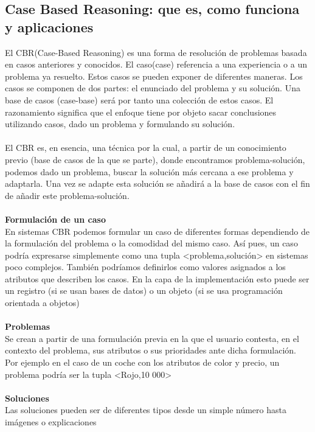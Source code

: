 \subsection{Case Based Reasoning: que es, como funciona y aplicaciones}
El CBR(Case-Based Reasoning)\cite{CBRLibro} es una forma de resolución de problemas basada en casos anteriores y conocidos. El caso(case) referencia a una experiencia o a un problema ya resuelto. Estos casos se pueden exponer de diferentes maneras. Los casos se componen de dos partes: el enunciado del problema y su solución. Una base de casos (case-base) será por tanto una colección de estos casos. El razonamiento significa que el enfoque tiene por objeto sacar conclusiones utilizando casos, dado un problema y formulando su solución.\\\\
El CBR es, en esencia, una técnica por la cual, a partir de un conocimiento previo (base de casos de la que se parte), donde encontramos problema-solución, podemos dado un problema, buscar la solución más cercana a ese problema y adaptarla. Una vez se adapte esta solución se añadirá a la base de casos con el fin de añadir este problema-solución.\\\\
\textbf{Formulación de un caso}\\
En sistemas CBR podemos formular un caso de diferentes formas dependiendo de la formulación del problema o la comodidad del mismo caso. Así pues, un caso podría expresarse simplemente como una tupla <problema,solución> en sistemas poco complejos. También podríamos definirlos como valores asignados a los atributos que describen los casos. En la capa de la implementación esto puede ser un registro (si se usan bases de datos) o un objeto (si se usa programación orientada a objetos)\\\\
\textbf{Problemas}\\
Se crean a partir de una formulación previa en la que el usuario contesta, en el contexto del problema, sus atributos o sus prioridades ante dicha formulación. Por ejemplo en el caso de un coche con los atributos de color y precio, un problema podría ser la tupla <Rojo,10 000>\\\\
\textbf{Soluciones}\\
Las soluciones pueden ser de diferentes tipos desde un simple número hasta imágenes o explicaciones \\\\
